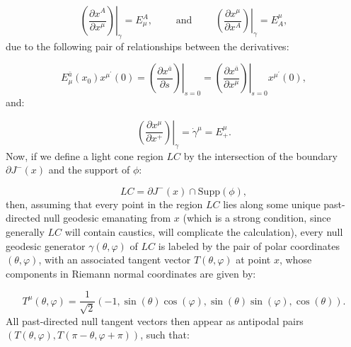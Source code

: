 \documentclass{article}
\begin{document}
\begin{equation}
\left. \left( \frac{\partial x^A}{\partial x^{\mu}} \right) \right\rvert_{\gamma} = E_{\mu}^{A}, \qquad \text{ and } \qquad \left. \left( \frac{\partial x^{\mu}}{\partial x^A} \right) \right\rvert_{\gamma} = E_{A}^{\mu},
\end{equation}
due to the following pair of relationships between the derivatives:

\begin{equation}
E_{\mu}^{\bar{a}} \left( x_ 0 \right) x^{\mu^{\prime}} \left( 0 \right) = \left. \left( \frac{\partial x^{\bar{a}}}{\partial s} \right) \right\rvert_{s = 0} = \left. \left( \frac{\partial x^{\bar{a}}}{\partial x^{\mu}} \right) \right\rvert_{s = 0} x^{\mu^{\prime}} \left( 0 \right),
\end{equation}
and:

\begin{equation}
\left. \left( \frac{\partial x^{\mu}}{\partial x^{+}} \right) \right\rvert_{\gamma} = \dot{\gamma}^{\mu} = E_{+}^{\mu}.
\end{equation}
Now, if we define a light cone region ${LC}$ by the intersection of the boundary ${\partial J^{-} \left( x \right)}$ and the support of ${\phi}$:

\begin{equation}
LC = \partial J^{-} \left( x \right) \cap \mathrm{Supp} \left( \phi \right),
\end{equation}
then, assuming that every point in the region ${LC}$ lies along some unique past-directed null geodesic emanating from $x$ (which is a strong condition, since generally ${LC}$ will contain caustics, will complicate the calculation), every null geodesic generator ${\gamma \left( \theta, \varphi \right)}$ of ${LC}$ is labeled by the pair of polar coordinates ${\left( \theta, \varphi \right)}$, with an associated tangent vector ${T \left( \theta, \varphi \right)}$ at point $x$, whose components in Riemann normal coordinates are given by:

\begin{equation}
T^{\mu} \left( \theta, \varphi \right) = \frac{1}{\sqrt{2}} \left( -1, \sin \left( \theta \right) \cos \left( \varphi \right), \sin \left( \theta \right) \sin \left( \varphi \right), \cos \left( \theta \right) \right).
\end{equation}
All past-directed null tangent vectors then appear as antipodal pairs ${\left( T \left( \theta, \varphi \right), T \left( \pi - \theta, \varphi + \pi \right) \right)}$, such that:
\end{document}
